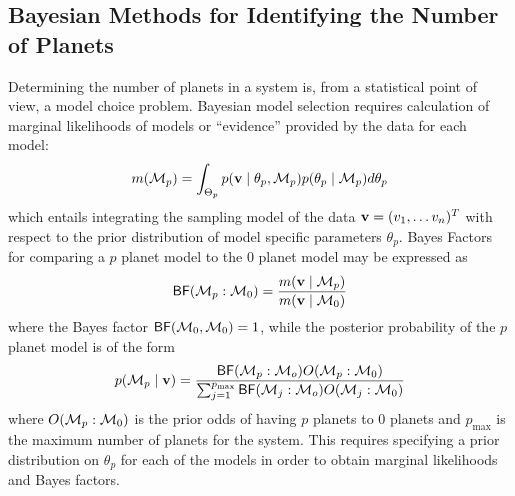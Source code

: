 \subsection{Bayesian Methods for Identifying the Number of Planets}
Determining the number of planets in a
system is, from a statistical point of view, a model choice
problem. Bayesian model selection requires calculation of marginal
likelihoods of models or ``evidence'' provided by the data for each model:
\begin{equation}\label{marginal_lik}
m( \M_p) = \int_{\Theta_p}
p(\v \mid \theta_p,\M_p) p(\theta_p \mid \M_p) d\theta_p
\end{equation} 
which entails integrating the sampling model of the
data $\mathbf{v} = (v_1, \ldots v_n)^T$ with respect to the prior distribution
of model specific parameters $\theta_p$.
Bayes Factors for comparing a $p$ planet model to the $0$ planet model
may be expressed  as
\begin{equation}
\BF(\M_p:\M_0)=\frac{m( \v \mid \M_p)}{m(\v \mid \M_0)}
\end{equation}
where the Bayes factor $\textsf{BF}({\cal{M}}_0,{\cal{M}}_0) = 1$,
while the posterior probability of the $p$ planet model is of the
form
\begin{equation}
  \label{eq:post-prob}
  p(\M_p \mid \v) = \frac{\BF(\M_p:\M_o) O(\M_p: \M_0)} 
{ \sum_{ j= 1}^{p_{\max}} \BF(\M_j:\M_o) O(\M_j: \M_0)}
\end{equation}
where $O({\cal{M}}_p: {\cal{M}}_0)$ is the prior odds of having $p$ planets to $0$
planets and $p_{\max}$ is the maximum number of planets for the
system.  This requires specifying a prior distribution on $\theta_p$
for each of the models in order to obtain marginal likelihoods and
Bayes factors.

